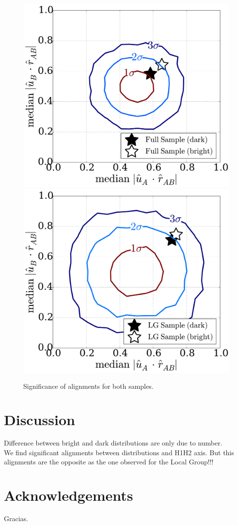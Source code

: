 \documentclass{emulateapj}
\begin{document}
\begin{figure}
\centering
\includegraphics[width=0.48\hsize]{significance_full_bright.pdf}
\includegraphics[width=0.48\hsize]{significance_lg_bright.pdf}
\caption{Significance of alignments for both samples.}
\label{fig:significance}
\end{figure}



\section{Discussion}
\label{Discussion}
Difference between bright and dark distributions are only due to number.\\
We find significant alignments between distributions and H1H2 axis. But this alignments are the opposite as the one observed for the Local Group!!! 
 
\section{Acknowledgements}
Gracias.
\end{document}
